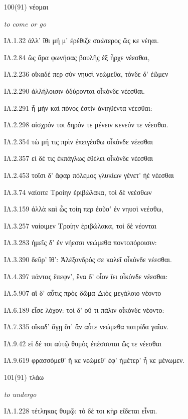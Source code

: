 \begin{enumerate}
{}




\clearpage
\item[\large 100(91)]{\large \g νέομαι}

\hspace{0.2cm} \textit{ to come or go }

{\g
ΙΛ.1.32 ἀλλ' ἴθι μή μ' ἐρέθιζε σαώτερος ὥς κε νέηαι.

ΙΛ.2.84 ὣς ἄρα φωνήσας βουλῆς ἐξ ἦρχε νέεσθαι,

ΙΛ.2.236 οἴκαδέ περ σὺν νηυσὶ νεώμεθα, τόνδε δ' ἐῶμεν

ΙΛ.2.290 ἀλλήλοισιν ὀδύρονται οἶκόνδε νέεσθαι.

ΙΛ.2.291 ἦ μὴν καὶ πόνος ἐστὶν ἀνιηθέντα νέεσθαι:

ΙΛ.2.298 αἰσχρόν τοι δηρόν τε μένειν κενεόν τε νέεσθαι.

ΙΛ.2.354 τὼ μή τις πρὶν ἐπειγέσθω οἶκόνδε νέεσθαι

ΙΛ.2.357 εἰ δέ τις ἐκπάγλως ἐθέλει οἶκόνδε νέεσθαι

ΙΛ.2.453 τοῖσι δ' ἄφαρ πόλεμος γλυκίων γένετ' ἠὲ νέεσθαι

ΙΛ.3.74 ναίοιτε Τροίην ἐριβώλακα, τοὶ δὲ νεέσθων

ΙΛ.3.159 ἀλλὰ καὶ ὧς τοίη περ ἐοῦσ' ἐν νηυσὶ νεέσθω,

ΙΛ.3.257 ναίοιμεν Τροίην ἐριβώλακα, τοὶ δὲ νέονται

ΙΛ.3.283 ἡμεῖς δ' ἐν νήεσσι νεώμεθα ποντοπόροισιν:

ΙΛ.3.390 δεῦρ' ἴθ': Ἀλέξανδρός σε καλεῖ οἶκόνδε νέεσθαι.

ΙΛ.4.397 πάντας ἔπεφν', ἕνα δ' οἶον ἵει οἶκόνδε νέεσθαι:

ΙΛ.5.907 αἳ δ' αὖτις πρὸς δῶμα Διὸς μεγάλοιο νέοντο

ΙΛ.6.189 εἷσε λόχον: τοὶ δ' οὔ τι πάλιν οἶκόνδε νέοντο:

ΙΛ.7.335 οἴκαδ' ἄγῃ ὅτ' ἂν αὖτε νεώμεθα πατρίδα γαῖαν.

ΙΛ.9.42 εἰ δέ τοι αὐτῷ θυμὸς ἐπέσσυται ὥς τε νέεσθαι

ΙΛ.9.619 φρασσόμεθ' ἤ κε νεώμεθ' ἐφ' ἡμέτερ' ἦ κε μένωμεν.

}

\clearpage
\item[\large 101(91)]{\large \g τλάω}

\hspace{0.2cm} \textit{ to undergo }

{\g
ΙΛ.1.228 τέτληκας θυμῷ: τὸ δέ τοι κὴρ εἴδεται εἶναι.

}
\end{enumerate}
